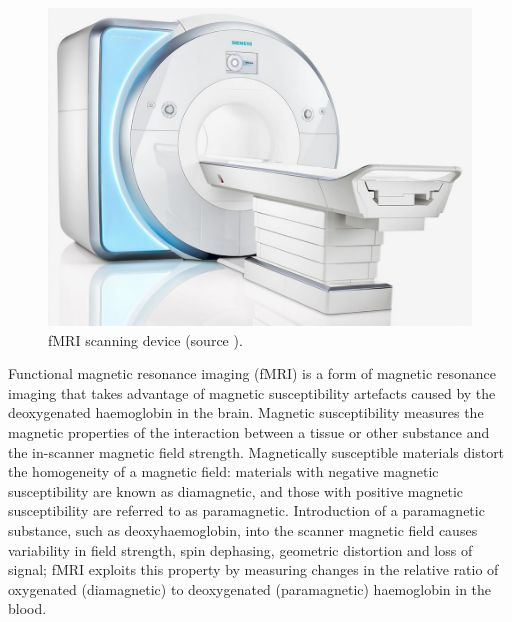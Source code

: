 \begin{figure}
	\centering
	\includegraphics[width=0.7\linewidth]{fig/fmridti/fMRI_scanner.jpg}
	\caption{fMRI scanning device (source \citet{fmriscanner}).}
	\label{fig:fmri_scanner}
\end{figure}

Functional magnetic resonance imaging (fMRI) is a form of magnetic resonance imaging that takes advantage of magnetic susceptibility artefacts caused by the deoxygenated haemoglobin in the brain. Magnetic susceptibility measures the magnetic properties of the interaction between a tissue or other substance and the in-scanner magnetic field strength. Magnetically susceptible materials distort the homogeneity of a magnetic field: materials with negative magnetic susceptibility are known as diamagnetic, and those with positive magnetic susceptibility are referred to as paramagnetic. Introduction of a paramagnetic substance, such as deoxyhaemoglobin, into the scanner magnetic field causes variability in field strength, spin dephasing, geometric distortion and loss of signal; fMRI exploits this property by measuring changes in the relative ratio of oxygenated (diamagnetic) to deoxygenated (paramagnetic) haemoglobin in the blood. 


